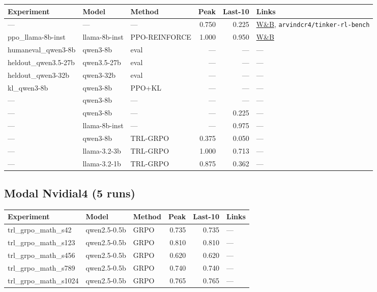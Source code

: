\documentclass[12pt,a4paper]{report}
\theoremstyle{definition}
\begin{document}
{\small
\begin{longtable}{p{3.5cm}p{2cm}p{1.2cm}rrp{3.5cm}}
\toprule
\textbf{Experiment} & \textbf{Model} & \textbf{Method} & \textbf{Peak} & \textbf{Last-10} & \textbf{Links} \\
\midrule
\endhead
--- & --- & --- & 0.750 & 0.225 & \href{https://wandb.ai/arvindcr4-pes-university/tinker-rl-lab-world-class/runs/ppo-gsm8k-Qwen3-8B-s42}{W\&B}, \texttt{arvindcr4/tinker-rl-bench} \\
ppo\_llama-8b-inst & llama-8b-inst & PPO-REINFORCE & 1.000 & 0.950 & \href{https://wandb.ai/arvindcr4-pes-university/tinker-rl-lab-world-class/runs/ppo-gsm8k-Llama-3.1-8B-Instruct-s42}{W\&B} \\
humaneval\_qwen3-8b & qwen3-8b & eval & --- & --- & --- \\
heldout\_qwen3.5-27b & qwen3.5-27b & eval & --- & --- & --- \\
heldout\_qwen3-32b & qwen3-32b & eval & --- & --- & --- \\
kl\_qwen3-8b & qwen3-8b & PPO+KL & --- & --- & --- \\
--- & qwen3-8b & --- & --- & --- & --- \\
--- & qwen3-8b & --- & --- & 0.225 & --- \\
--- & llama-8b-inst & --- & --- & 0.975 & --- \\
--- & qwen3-8b & TRL-GRPO & 0.375 & 0.050 & --- \\
--- & llama-3.2-3b & TRL-GRPO & 1.000 & 0.713 & --- \\
--- & llama-3.2-1b & TRL-GRPO & 0.875 & 0.362 & --- \\
\bottomrule
\end{longtable}
}

\subsection{Modal Nvidial4 (5 runs)}
\label{sec:registry-modal-nvidial4}

{\small
\begin{longtable}{p{3.5cm}p{2cm}p{1.2cm}rrp{3.5cm}}
\toprule
\textbf{Experiment} & \textbf{Model} & \textbf{Method} & \textbf{Peak} & \textbf{Last-10} & \textbf{Links} \\
\midrule
\endhead
trl\_grpo\_math\_s42 & qwen2.5-0.5b & GRPO & 0.735 & 0.735 & --- \\
trl\_grpo\_math\_s123 & qwen2.5-0.5b & GRPO & 0.810 & 0.810 & --- \\
trl\_grpo\_math\_s456 & qwen2.5-0.5b & GRPO & 0.620 & 0.620 & --- \\
trl\_grpo\_math\_s789 & qwen2.5-0.5b & GRPO & 0.740 & 0.740 & --- \\
trl\_grpo\_math\_s1024 & qwen2.5-0.5b & GRPO & 0.765 & 0.765 & --- \\
\bottomrule
\end{longtable}
}
\end{document}
